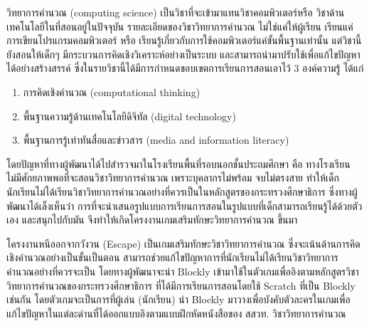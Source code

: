 \maketitle
\makesignature

\ifproject
\begin{abstractTH}

วิทยาการคำนวณ (computing science) เป็นวิชาที่จะเข้ามาแทนวิชาคอมพิวเตอร์หรือ วิชาด้านเทคโนโลยีในที่สอนอยู่ในปัจจุบัน 
รายละเอียดของวิชาวิทยาการคำนวณ ไม่ใช่แค่ให้ผู้เรียน เรียนแค่การเขียนโปรแกรมคอมพิวเตอร์ หรือ เรียนรู้เกี่ยวกับการใช้คอมพิวเตอร์แค่ขั้นพื้นฐานเท่านั้น 
แต่วิชานี้ยังสอนให้เด็กๆ มีกระบวนการคิดเชิงวิเคราะห์อย่างเป็นระบบ และสามารถนำมาปรับใช้เพื่อแก้ไขปัญหาได้อย่างสร้างสรรค์ 
ซึ่งในรายวิชานี้ได้มีการกำหนดขอบเขตการเรียนการสอนเอาไว้ 3 องค์ความรู้ ได้แก่
\begin{enumerate}
\item การคิดเชิงคำนวณ (computational thinking)
\item พื้นฐานความรู้ด้านเทคโนโลยีดิจิทัล (digital technology) 
\item พื้นฐานการรู้เท่าทันสื่อและข่าวสาร (media and information literacy) 
\end{enumerate}
โดยปัญหาที่ทางผู้พัฒนาได้ไปสำรวจมาในโรงเรียนพื้นที่รอบนอกชั้นประถมศึกษา คือ ทางโรงเรียนไม่มีศักยภาพพอที่จะสอนวิชาวิทยาการคำนวณ 
เพราะบุคลากรไม่พร้อม จบไม่ตรงสาย ทำให้เด็กนักเรียนไม่ได้เรียนวิชาวิทยาการคำนวณอย่างที่ควรเป็นในหลักสูตรของกระทรวงศึกษาธิการ 
ซึ่งทางผู้พัฒนาได้เล็งเห็นว่า การที่จะนำเสนอรูปแบบการเรียนการสอนในรูปแบบที่เด็กสามารถเรียนรู้ได้ด้วยตัวเอง และสนุกไปกับมัน 
จึงทำให้เกิดโครงงานเกมเสริมทักษะวิทยาการคำนวณ ขึ้นมา

โครงงานหนีออกจากวังวน (Escape) เป็นเกมเสริมทักษะวิชาวิทยาการคำนวณ ซึ่งจะเน้นด้านการคิดเชิงคำนวณอย่างเป็นขั้นเป็นตอน
สามารถช่วยแก้ไขปัญหาการที่นักเรียนไม่ได้เรียนวิชาวิทยาการคำนวณอย่างที่ควรจะเป็น 
โดยทางผู้พัฒนาจะนำ Blockly เข้ามาใช้ในตัวเกมเพื่ออิงตามหลักสูตรวิชาวิทยาการคำนวณของกระทรวงศึกษาธิการ 
ที่ได้มีการเรียนการสอนโดยใช้ Scratch ที่เป็น Blockly เช่นกัน 
โดยตัวเกมจะเป็นการที่ผู้เล่น (นักเรียน) นำ Blockly มาวางเพื่อบังคับตัวละครในเกมเพื่อแก้ไขปัญหาในแต่ละด่านที่ได้ออกแบบอิงตามแบบฝึกหัดหนังสือของ 
สสวท. วิชาวิทยาการคำนวณ
\end{abstractTH}

